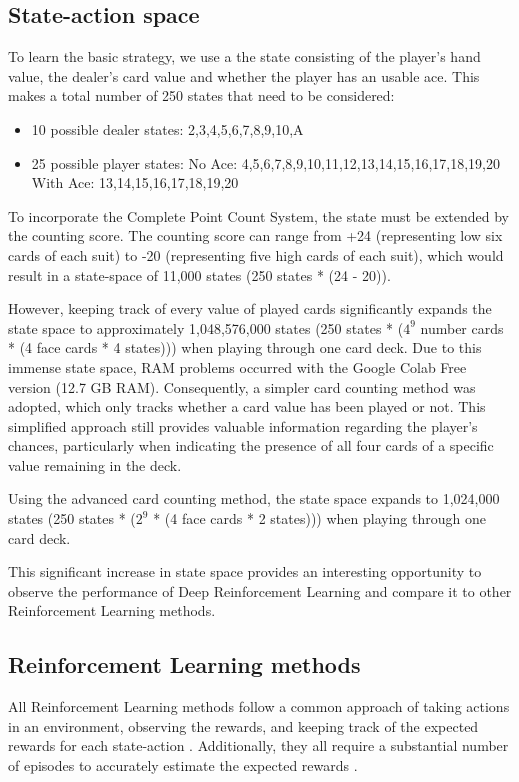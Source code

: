 \documentclass[conference]{IEEEtran}
\begin{document}
\subsection{State-action space}
To learn the basic strategy, we use a the state consisting of the player's hand value, the dealer's card value and whether the player has an usable ace. 
This makes a total number of 250 states that need to be considered:
\begin{itemize}
	\item 10 possible dealer states: 2,3,4,5,6,7,8,9,10,A
	\item 25 possible player states:
		\subitem No Ace: 4,5,6,7,8,9,10,11,12,13,14,15,16,17,18,19,20
		\subitem With Ace: 13,14,15,16,17,18,19,20
\end{itemize}

To incorporate the Complete Point Count System, the state must be extended by the counting score. The counting score can range from +24 (representing low six cards of each suit) to -20 (representing five high cards of each suit), which would result in a state-space of 11,000 states (250 states * (24 - 20)).

However, keeping track of every value of played cards significantly expands the state space to approximately 1,048,576,000 states (250 states * ($4^9$ number cards * (4 face cards * 4 states))) when playing through one card deck. Due to this immense state space, RAM problems occurred with the Google Colab Free version (12.7 GB RAM). Consequently, a simpler card counting method was adopted, which only tracks whether a card value has been played or not. This simplified approach still provides valuable information regarding the player's chances, particularly when indicating the presence of all four cards of a specific value remaining in the deck.

Using the advanced card counting method, the state space expands to 1,024,000 states (250 states * ($2^9$ * (4 face cards * 2 states))) when playing through one card deck.

This significant increase in state space provides an interesting opportunity to observe the performance of Deep Reinforcement Learning and compare it to other Reinforcement Learning methods.


\subsection{Reinforcement Learning methods}
All Reinforcement Learning methods follow a common approach of taking actions in an environment, observing the rewards, and keeping track of the expected rewards for each state-action \cite{b4}. Additionally, they all require a substantial number of episodes to accurately estimate the expected rewards \cite{b4}.
\end{document}
